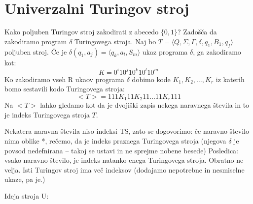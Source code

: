 \documentclass[10pt,a4paper,oneside]{book}
\begin{document}
\section{Univerzalni Turingov stroj}

Kako poljuben Turingov stroj zakodirati z abecedo $\{0,1\}$?
Zadošča da zakodiramo program $\delta$ Turingovega stroja.%
Naj bo $T=\langle Q,\Sigma,\Gamma,\delta,q_1,B_1,q_f \rangle$ poljuben stroj.%
Če je $\delta(q_1,a_j)=\langle q_k, a_l, S_m \rangle$ ukaz programa $\delta$, ga zakodiramo kot:
	\[ K=0^i 1 0^j 1 0^k 1 0^l 1 0^m\]
Ko zakodiramo vseh R ukaov programa $\delta$ dobimo kode $K_1, K_2, \dots, K_r$ iz katerih bomo sestavili kodo Turingovega stroja:
	\[ <T> = 111 K_1 11 K_2 11 \dots 11 K_r 111\]%
Na $<T>$ lahko gledamo kot da je dvojiški zapis nekega naravnega števila in to je indeks Turingovega stroja $T$.

Nekatera naravna števila niso indeksi TS, zato se dogovorimo: če naravno število nima oblike *, rečemo, da je indeks praznega Turingovega stroja (njegova $\delta$ je povsod nedefnirana -- takoj se ustavi in ne sprejme nobene besede)
Posledica: vsako naravno število, je indeks natanko enega Turingovega stroja.
Obratno ne velja. Isti Turingov stroj ima več indeksov (dodajamo nepotrebne in nesmiselne ukaze, pa je.)
%


Ideja stroja U:

\end{document}
